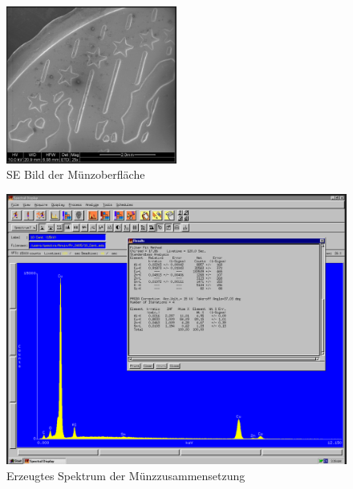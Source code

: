 \documentclass[12pt,english,ngerman]{scrartcl}
\begin{document}
\begin{figure}[H]
	\begin{center}
		\includegraphics[width =0.5\textwidth]{./figures/munze.png}
	\end{center}
	\caption{SE Bild der Münzoberfläche \cite{sein_foto}}
    \label{fig:munze}
\end{figure}

\begin{figure}[H]
	\begin{center}
		\includegraphics[width =\textwidth]{./figures/qualitativ1.png}
	\end{center}
	\caption{Erzeugtes Spektrum der Münzzusammensetzung \cite{sein_foto}}
    \label{fig:qualitativ1}
\end{figure}
\end{document}
